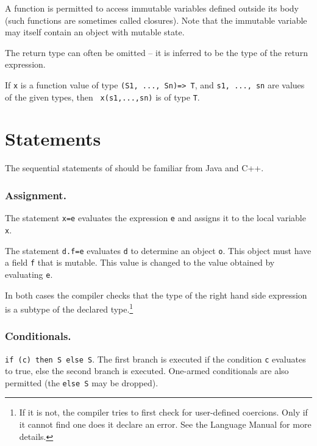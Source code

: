 A function is permitted to access immutable variables defined outside
its body (such functions are sometimes called closures). Note that the
immutable variable may itself contain an object with mutable state.

The return type can often be omitted  -- it is inferred to be the
type of the return expression.

If {\tt x} is a  function value of type {\tt (S1, ..., Sn)=> T}, and 
{\tt s1, ..., sn} are values of the given types, then {\tt
  x(s1,...,sn)} is of type {\tt T}. 


\section{Statements} \label{sec:x10-basic-statements}

The sequential statements of \Xten{} should be familiar   from Java
and C++.

\subsubsection{Assignment.}
The statement {\tt x=e} evaluates the expression
 {\tt e} and assigns it to the local variable {\tt x}.

The statement
 {\tt d.f=e} evaluates {\tt d} to determine an object {\tt o}. This
 object must have a field {\tt f} that is mutable. This value is
 changed to the value obtained by evaluating {\tt e}.

In both cases the compiler
 checks that the type of the right hand side expression is a subtype
 of the declared type.\footnote{If it is not, the compiler tries to
   first check for user-defined coercions. Only if it cannot find one
   does it declare an error. See the Language Manual for more details.}


\subsubsection{Conditionals.} {\tt if (c) then S else S}. The first branch is
 executed if the condition {\tt c} evaluates to true, else the second
 branch is executed. One-armed conditionals are also permitted (the
 {\tt else S} may be dropped).

